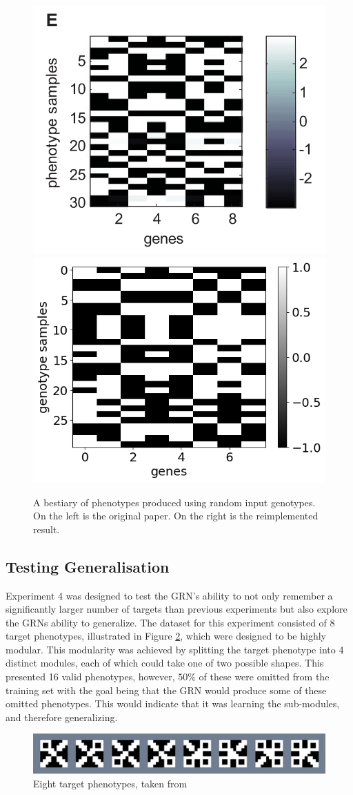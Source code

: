 \documentclass[twocolumn,a4paper,11pt]{article}
\begin{document}
    \begin{figure}[h]
        \centering
        \includegraphics[width=0.45\linewidth]{orig_img/fig2e.png}
        \includegraphics[width=0.45\linewidth]{img/fig2e.png}
        \caption{A bestiary of phenotypes produced using random input genotypes. On the left is the original paper. On the right is the reimplemented result.} \label{fig:2e}
    \end{figure}

    \subsection{Testing Generalisation} \label{sec:tg}
    Experiment 4 was designed to test the GRN's ability to not only remember a significantly larger number of targets than previous experiments but also explore the GRNs ability to generalize. The dataset for this experiment consisted of 8 target phenotypes, illustrated in Figure \ref{fig:4-targets}, which were designed to be highly modular. This modularity was achieved by splitting the target phenotype into 4 distinct modules, each of which could take one of two possible shapes. This presented 16 valid phenotypes, however, $50\%$ of these were omitted from the training set with the goal being that the GRN would produce some of these omitted phenotypes. This would indicate that it was learning the sub-modules, and therefore generalizing.

    \begin{figure}[h]
        \centering
        \includegraphics[width=0.7\linewidth]{orig_img/ex4_targets.png}
        \caption{Eight target phenotypes, taken from \cite{original-paper}} \label{fig:4-targets}
    \end{figure}
\end{document}
